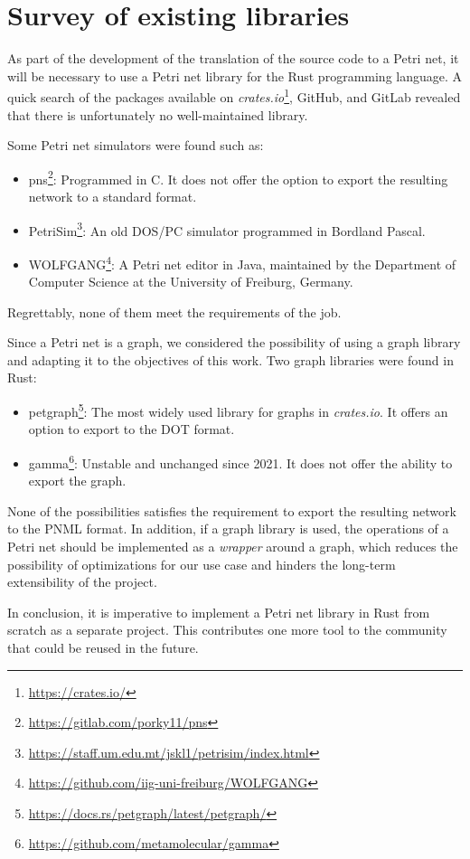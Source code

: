 \documentclass[../Thesis.tex]{subfiles}
\begin{document}
\section{Survey of existing libraries}

As part of the development of the translation of the source code to a Petri net,
it will be necessary to use a Petri net library for the Rust programming language.
A quick search of the packages available on
\emph{crates.io}\footnote{\url{https://crates.io/}}, GitHub, and GitLab
revealed that there is unfortunately no well-maintained library.

Some Petri net simulators were found such as:

\begin{itemize}
      \item pns\footnote{\url{https://gitlab.com/porky11/pns}}:
            Programmed in C. It does not offer the option
            to export the resulting network to a standard format.
      \item PetriSim\footnote{\url{https://staff.um.edu.mt/jskl1/petrisim/index.html}}:
            An old DOS/PC simulator programmed in Bordland Pascal.
      \item WOLFGANG\footnote{\url{https://github.com/iig-uni-freiburg/WOLFGANG}}:
            A Petri net editor in Java, maintained by the Department of Computer Science
            at the University of Freiburg, Germany.
\end{itemize}

Regrettably, none of them meet the requirements of the job.

Since a Petri net is a graph, we considered the possibility
of using a graph library and adapting it to the objectives of this work.
Two graph libraries were found in Rust:

\begin{itemize}
      \item petgraph\footnote{\url{https://docs.rs/petgraph/latest/petgraph/}}:
            The most widely used library for graphs in \textit{crates.io}.
            It offers an option to export to the DOT format.
      \item gamma\footnote{\url{https://github.com/metamolecular/gamma}}:
            Unstable and unchanged since 2021. It does not offer the ability to export the graph.
\end{itemize}

None of the possibilities satisfies the requirement
to export the resulting network to the PNML format.
In addition, if a graph library is used,
the operations of a Petri net should be implemented as a \emph{wrapper} around a graph,
which reduces the possibility of optimizations for our use case
and hinders the long-term extensibility of the project.

In conclusion, it is imperative
to implement a Petri net library in Rust from scratch as a separate project.
This contributes one more tool to the community that could be reused in the future.
\end{document}
